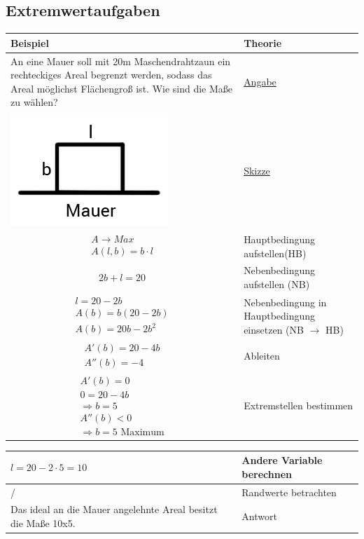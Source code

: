 \documentclass[../mainfile.tex]{subfiles}
\begin{document}
	\subsection{Extremwertaufgaben}
		\def\tabularxcolumn#1{m{#1}}
		\begin{tabularx}{\textwidth}{ | X | X |}
			\hline
			Beispiel & Theorie \\
			\hline 
			An eine Mauer soll mit 20m Maschendrahtzaun ein rechteckiges Areal begrenzt werden, sodass das Areal möglichst Flächengroß ist. Wie sind die Maße zu wählen? &  \underline{Angabe} \\
			\hline 
			\includegraphics[scale=0.4]{./kurbaniec/img/diff1_009_01.png} & \underline{Skizze} \\
			\hline
			\begin{gather*}
			A \rightarrow Max \\
			A(l, b) = b \cdot l
			\end{gather*}
			 &  Hauptbedingung aufstellen(HB)\\
			\hline
			\[2b+l=20\] & Nebenbedingung aufstellen (NB) \\
			\hline
			\begin{gather*}
			l = 20 - 2b \\
			A(b) = b(20-2b) \\
			A(b) = 20b - 2b^2  
			\end{gather*} & Nebenbedingung in Hauptbedingung einsetzen (NB $\rightarrow$ HB) \\
			\hline
			\begin{gather*}
			A'(b) = 20-4b \\
			A''(b)=-4
			\end{gather*} & Ableiten \\
		 	\hline
		 	\begin{gather*} 
		 	A'(b) = 0 \\
		 	0 = 20-4b \\
		 	\Longrightarrow b = 5 \\
		 	A''(b) < 0 \\
		 	\Longrightarrow b = 5 \text{ Maximum}
		 	\end{gather*} & Extremstellen bestimmen \\
		 	\hline
		 \end{tabularx}
	 	 \begin{tabularx}{\textwidth}{ | X | X |}
			\hline 
		 	$l = 20 - 2 \cdot 5 = 10$ & Andere Variable berechnen \\
		 	\hline
		 	/ & Randwerte betrachten \\
		 	\hline
		 	Das ideal an die Mauer angelehnte Areal besitzt die Maße 10x5. & Antwort \\
		 	\hline

		\end{tabularx}
\end{document}
